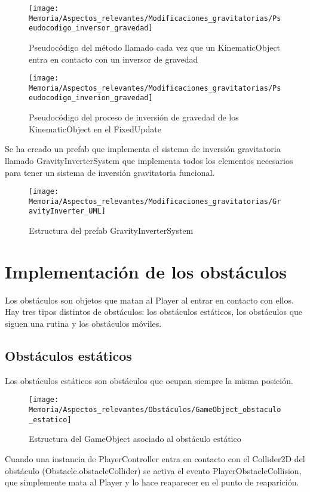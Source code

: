 \begin{figure}[h]
\centering
\texttt{[image: Memoria/Aspectos\_relevantes/Modificaciones\_gravitatorias/Pseudocodigo\_inversor\_gravedad]}
\caption{Pseudocódigo del método llamado cada vez que un KinematicObject entra en contacto con un inversor de gravedad}
\end{figure}

\begin{figure}[h]
\centering
\texttt{[image: Memoria/Aspectos\_relevantes/Modificaciones\_gravitatorias/Pseudocodigo\_inverion\_gravedad]}
\caption{Pseudocódigo del proceso de inversión de gravedad de los KinematicObject en el FixedUpdate}
\end{figure}

Se ha creado un prefab que implementa el sistema de inversión gravitatoria llamado GravityInverterSystem que implementa todos los elementos necesarios para tener un sistema de inversión gravitatoria funcional.

\begin{figure}[h]
\centering
\texttt{[image: Memoria/Aspectos\_relevantes/Modificaciones\_gravitatorias/GravityInverter\_UML]}
\caption{Estructura del prefab GravityInverterSystem}
\end{figure}

\section{Implementación de los obstáculos}
Los obstáculos son objetos que matan al Player al entrar en contacto con ellos. Hay tres tipos distintos de obstáculos: los obstáculos estáticos, los obstáculos que siguen una rutina y los obstáculos móviles.

\subsection{Obstáculos estáticos}
Los obstáculos estáticos son obstáculos que ocupan siempre la misma posición.

\begin{figure}[h]
\centering
\texttt{[image: Memoria/Aspectos\_relevantes/Obstáculos/GameObject\_obstaculo\_estatico]}
\caption{Estructura del GameObject asociado al obstáculo estático}
\end{figure}

Cuando una instancia de PlayerController entra en contacto con el Collider2D del obstáculo (Obstacle.obstacleCollider) se activa el evento PlayerObstacleCollision, que simplemente mata al Player y lo hace reaparecer en el punto de reaparición.

